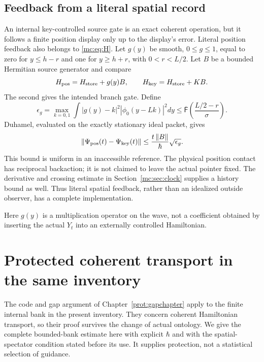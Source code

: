 \documentclass[11pt,oneside,openany]{book}
\theoremstyle{definition}
\theoremstyle{remark}\newtheorem{remark}[theorem]{Remark}
\providecommand{\norm}[1]{\left\lVert#1\right\rVert}
\providecommand{\mcNtail}{\overline{\mathsf F}}
\begin{document}
\subsection{Feedback from a literal spatial record}
An internal key-controlled source gate is an exact coherent operation, but it follows a finite position display only up to the display's error. Literal position feedback also belongs to \eqref{mc:eq:H}. Let $g(y)$ be smooth, $0\le g\le1$, equal to zero for $y\le h-r$ and one for $y\ge h+r$, with $0<r<L/2$. Let $B$ be a bounded Hermitian source generator and compare
\[
 H_{\rm pos}=H_{\rm store}+g(y)B,\qquad
 H_{\rm key}=H_{\rm store}+KB.
\]
The second gives the intended branch gate. Define
\begin{equation}\label{mc:eq:feedbacktail}
 \epsilon_g=\max_{k=0,1}\int |g(y)-k|^2|\phi_0(y-Lk)|^2dy
 \le\mcNtail\left(\frac{L/2-r}{\sigma}\right).
\end{equation}
Duhamel, evaluated on the exactly stationary ideal packet, gives
\begin{equation}\label{mc:eq:feedbackbound}
 \norm{\Psi_{\rm pos}(t)-\Psi_{\rm key}(t)}
 \le\frac{t\norm B}{\hbar}\sqrt{\epsilon_g}.
\end{equation}
This bound is uniform in an inaccessible reference. The physical position contact has reciprocal backaction; it is not claimed to leave the actual pointer fixed. The derivative and crossing estimate in Section~\ref{mc:sec:clock} supplies a history bound as well. Thus literal spatial feedback, rather than an idealized outside observer, has a complete implementation.

Here $g(y)$ is a multiplication operator on the wave, not a coefficient obtained by inserting the actual $Y_t$ into an externally controlled Hamiltonian.

\section{Protected coherent transport in the same inventory}
\label{mc:sec:protection}
The code and gap argument of Chapter~\ref{prot:gapchapter} apply to the
finite internal bank in the present inventory. They concern coherent
Hamiltonian transport, so their proof survives the change of actual
ontology. We give the complete bounded-bank estimate here with explicit
$\hbar$ and with the spatial-spectator condition stated before its use.
It supplies protection, not a statistical selection of guidance.
\end{document}
